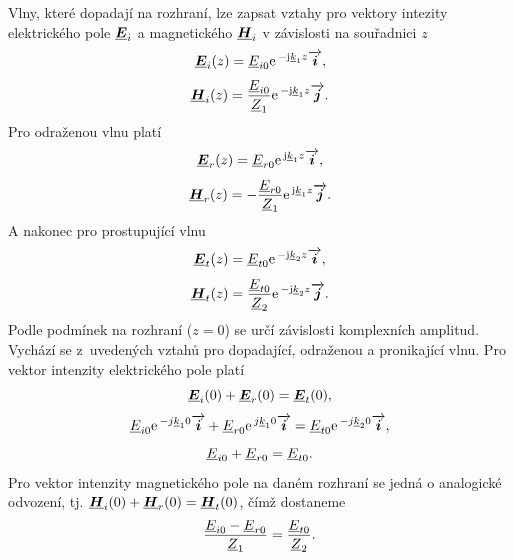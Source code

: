 Vlny, které dopadají na rozhraní, lze zapsat vztahy pro vektory intezity elektrického pole $\mbox{\underline{\boldmath$E$}}_{i}$ a magnetického $\mbox{\underline{\boldmath$H$}}_{i}$ v závislosti na souřadnici $z$
\begin{displaymath}
	\mbox{\underline{\boldmath$E$}}_{i}(z) = {\underline{E}}_{i0}\mathrm{e\,}^{-\mathrm{j}{\underline{k}}_{1}z}\overrightarrow{\mbox{\boldmath$i$}},
\end{displaymath}
\begin{displaymath}
	\mbox{\underline{\boldmath$H$}}_{i}(z) = \frac{{\underline{E}}_{i0}}{{\underline{Z}}_{1}}\mathrm{e\,}^{-\mathrm{j}{\underline{k}}_{1}z}\overrightarrow{\mbox{\boldmath$j$}}.
\end{displaymath}
Pro odraženou vlnu platí
\begin{displaymath}
	\mbox{\underline{\boldmath$E$}}_{r}(z) = {\underline{E}}_{r0}\mathrm{e\,}^{\mathrm{j}{\underline{k}}_{1}z}\overrightarrow{\mbox{\boldmath$i$}},
\end{displaymath}
\begin{displaymath}
	\mbox{\underline{\boldmath$H$}}_{r}(z) = - \frac{{\underline{E}}_{r0}}{{\underline{Z}}_{1}}\mathrm{e\,}^{\mathrm{j}{\underline{k}}_{1}z}\overrightarrow{\mbox{\boldmath$j$}}.
\end{displaymath}
A nakonec pro prostupující vlnu
\begin{displaymath}
	\mbox{\underline{\boldmath$E$}}_{t}(z) = {\underline{E}}_{t0}\mathrm{e\,}^{-\mathrm{j}{\underline{k}}_{2}z}\overrightarrow{\mbox{\boldmath$i$}},
\end{displaymath}
\begin{displaymath}
	\mbox{\underline{\boldmath$H$}}_{t}(z) = \frac{{\underline{E}}_{t0}}{{\underline{Z}}_{2}}\mathrm{e\,}^{-\mathrm{j}{\underline{k}}_{2}z}\overrightarrow{\mbox{\boldmath$j$}}.
\end{displaymath}
Podle podmínek na rozhraní ($z = 0$) se určí závislosti komplexních amplitud. Vychází se z~uvedených vztahů pro dopadající, odraženou a pronikající vlnu.
Pro vektor intenzity elektrického pole platí
\begin{displaymath}
	\mbox{\underline{\boldmath$E$}}_{i}(0) + \mbox{\underline{\boldmath$E$}}_{r}(0)  = \mbox{\underline{\boldmath$E$}}_{t}(0),
\end{displaymath}
\begin{displaymath}
	 {\underline{E}}_{i0}\mathrm{e\,}^{-j{\underline{k}}_{1}0}\overrightarrow{\mbox{\boldmath$i$}} + {\underline{E}}_{r0}\mathrm{e\,}^{j{\underline{k}}_{1}0}\overrightarrow{\mbox{\boldmath$i$}}  = {\underline{E}}_{t0}\mathrm{e\,}^{-j{\underline{k}}_{2}0}\overrightarrow{\mbox{\boldmath$i$}},
\end{displaymath}
\begin{equation}
	{\underline{E}}_{i0} + {\underline{E}}_{r0}  = {\underline{E}}_{t0}.
	\label{rce:evlny_rozhrani_E}
\end{equation}
Pro vektor intenzity magnetického pole na daném rozhraní se jedná o analogické odvození, tj. $\mbox{\underline{\boldmath$H$}}_{i}(0) + \mbox{\underline{\boldmath$H$}}_{r}(0)  = \mbox{\underline{\boldmath$H$}}_{t}(0)$, čímž dostaneme
\begin{equation}
	\frac{{\underline{E}}_{i0}-{\underline{E}}_{r0}}{{\underline{Z}}_{1}} = \frac{{\underline{E}}_{t0}}{{\underline{Z}}_{2}}.
	\label{rce:evlny_rozhrani_H}
\end{equation}
